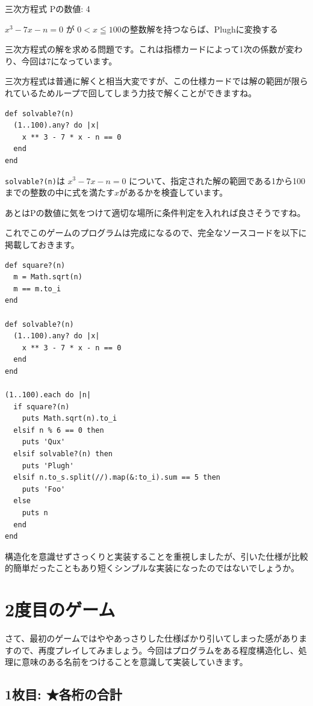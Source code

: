 \documentclass[index]{subfiles}
\begin{document}
\begin{itembox}[l]{三次方程式}
Pの数値: 4

$x^3-7x - n = 0$ が $0 < x ≦ 100$の整数解を持つならば、Plughに変換する
\end{itembox}

三次方程式の解を求める問題です。これは指標カードによって1次の係数が変わり、今回は7になっています。

三次方程式は普通に解くと相当大変ですが、この仕様カードでは解の範囲が限られているためループで回してしまう力技で解くことができますね。

\begin{lstlisting}
def solvable?(n)
  (1..100).any? do |x|
    x ** 3 - 7 * x - n == 0
  end
end
\end{lstlisting}

\verb+solvable?(n)+は $x^3 - 7x - n = 0$ について、指定された解の範囲である1から100までの整数の中に式を満たす$x$があるかを検査しています。

あとはPの数値に気をつけて適切な場所に条件判定を入れれば良さそうですね。

これでこのゲームのプログラムは完成になるので、完全なソースコードを以下に掲載しておきます。

\begin{lstlisting}
def square?(n)
  m = Math.sqrt(n)
  m == m.to_i
end

def solvable?(n)
  (1..100).any? do |x|
    x ** 3 - 7 * x - n == 0
  end
end

(1..100).each do |n|
  if square?(n)
    puts Math.sqrt(n).to_i
  elsif n % 6 == 0 then
    puts 'Qux'
  elsif solvable?(n) then
    puts 'Plugh'
  elsif n.to_s.split(//).map(&:to_i).sum == 5 then
    puts 'Foo'
  else
    puts n
  end
end
\end{lstlisting}

構造化を意識せずさっくりと実装することを重視しましたが、引いた仕様が比較的簡単だったこともあり短くシンプルな実装になったのではないでしょうか。

  \section{2度目のゲーム}
  \label{sec:replay_second}

さて、最初のゲームではややあっさりした仕様ばかり引いてしまった感がありますので、再度プレイしてみましょう。今回はプログラムをある程度構造化し、処理に意味のある名前をつけることを意識して実装していきます。

  \subsection{1枚目: ★各桁の合計}
\end{document}
